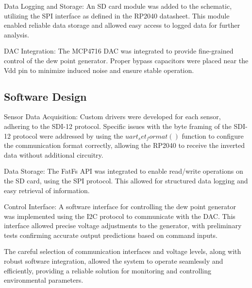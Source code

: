 Data Logging and Storage: An SD card module was added to the schematic, utilizing the SPI interface as defined in the RP2040 datasheet. This module enabled reliable data storage and allowed easy access to logged data for further analysis.

DAC Integration: The MCP4716 DAC was integrated to provide fine-grained control of the dew point generator. Proper bypass capacitors were placed near the Vdd pin to minimize induced noise and ensure stable operation.


\subsection{Software Design}
Sensor Data Acquisition: Custom drivers were developed for each sensor, adhering to the SDI-12 protocol. Specific issues with the byte framing of the SDI-12 protocol were addressed by using the $uart_set_format()$ function to configure the communication format correctly, allowing the RP2040 to receive the inverted data without additional circuitry.

Data Storage: The FatFs API was integrated to enable read/write operations on the SD card, using the SPI protocol. This allowed for structured data logging and easy retrieval of information.

Control Interface: A software interface for controlling the dew point generator was implemented using the I2C protocol to communicate with the DAC. This interface allowed precise voltage adjustments to the generator, with preliminary tests confirming accurate output predictions based on command inputs.


The careful selection of communication interfaces and voltage levels, along with robust software integration, allowed the system to operate seamlessly and efficiently, providing a reliable solution for monitoring and controlling environmental parameters.